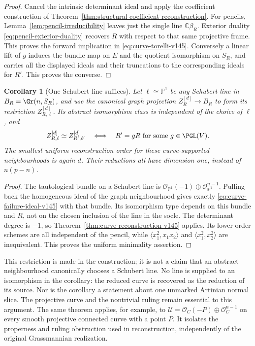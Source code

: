 \documentclass[11pt,reqno]{amsart}
\numberwithin{equation}{section}
\newtheorem{corollary}[theorem]{Corollary}
\theoremstyle{definition}\newtheorem{definition}[theorem]{Definition}
\theoremstyle{remark}\newtheorem{remark}[theorem]{Remark}
\newcommand{\C}{\mathbb C}\newcommand{\Q}{\mathbb Q}
\newcommand{\Pj}{\mathbb P}\newcommand{\A}{\mathbb A}
\newcommand{\OO}{\mathcal O}\newcommand{\II}{\mathcal I}
\begin{document}
\begin{proof}
Cancel the intrinsic determinant ideal and apply the coefficient
construction of Theorem~\ref{thm:structural-coefficient-reconstruction}.
For pencils, Lemma~\ref{lem:pencil-irreducibility} leaves just the
single line \(\C\beta_R\).  Exterior duality
\eqref{eq:pencil-exterior-duality} recovers \(R\) with respect to
that same projective frame.  This proves the forward implication in
\eqref{eq:curve-torelli-v145}.  Conversely a linear lift of \(g\)
induces the bundle map on \(E\) and the quotient isomorphism on
\(S_R\), and carries all the displayed ideals and their truncations
to the corresponding ideals for \(R'\).  This proves the converse.
\end{proof}

\begin{corollary}[One Schubert line suffices]
\label{cor:schubert-line-reconstruction-v145}
Let \(\ell\simeq\Pj^1\) be any Schubert line in
\(B_R=\Gr(n,S_R)\), and use the canonical graph projection
\(Z_R^{[d]}\to B_R\) to form its restriction \(Z_{R,\ell}^{[d]}\).
Its abstract isomorphism class is independent of the choice of
\(\ell\), and
\[
 Z_{R,\ell}^{[d]}\simeq Z_{R',\ell'}^{[d]}
       \quad\Longleftrightarrow\quad R'=gR
                       \text{ for some }g\in\PGL(V).
\]
The smallest uniform reconstruction order for these curve-supported
neighbourhoods is again \(d\).  Their reductions all have dimension
one, instead of \(n(p-n)\).
\end{corollary}
\begin{proof}
The tautological bundle on a Schubert line is
\(\OO_{\Pj^1}(-1)\oplus\OO_{\Pj^1}^{n-1}\).
Pulling back the homogeneous ideal of the graph neighbourhood gives
exactly \eqref{eq:curve-failure-ideal-v145} with that bundle.  Its
isomorphism type depends on this bundle and \(R\), not on the
chosen inclusion of the line in the socle.  The determinant degree
is \(-1\), so Theorem~\ref{thm:curve-reconstruction-v145} applies.
Its lower-order schemes are all independent of the pencil, while
\(\langle x_1^2,x_1x_2\rangle\) and
\(\langle x_1^2,x_2^2\rangle\) are inequivalent.  This proves
the uniform minimality assertion.
\end{proof}

This restriction is made in the construction; it is not a claim that
an abstract neighbourhood canonically chooses a Schubert line.  No
line is supplied to an isomorphism in the corollary: the reduced curve
is recovered as the reduction of its source.  Nor is the corollary a
statement about one unmarked Artinian normal slice.  The projective
curve and the nontrivial ruling remain essential to this argument.
The same theorem applies, for example, to
\(\mathcal U=\OO_C(-P)\oplus\OO_C^{n-1}\) on every smooth
projective connected curve with a point \(P\).  It isolates the
properness and ruling obstruction used in reconstruction, independently
of the original Grassmannian realization.
\end{document}

